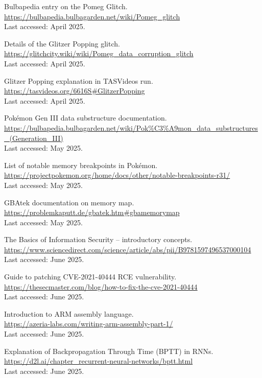 \documentclass[a4paper]{usiinfbachelorproject}
\begin{document}
\begin{thebibliography}{99}
	Bulbapedia entry on the Pomeg Glitch.\\
	\url{https://bulbapedia.bulbagarden.net/wiki/Pomeg_glitch}\\
	Last accessed: April 2025.


	Details of the Glitzer Popping glitch.\\
	\url{https://glitchcity.wiki/wiki/Pomeg_data_corruption_glitch}\\
	Last accessed: April 2025.


	Glitzer Popping explanation in TASVideos run.\\
	\url{https://tasvideos.org/6616S#GlitzerPopping}\\
	Last accessed: April 2025.


	Pokémon Gen III data substructure documentation.\\
	\url{https://bulbapedia.bulbagarden.net/wiki/Pok%C3%A9mon_data_substructures_(Generation_III)}\\
	Last accessed: May 2025.


	List of notable memory breakpoints in Pokémon.\\
	\url{https://projectpokemon.org/home/docs/other/notable-breakpoints-r31/}\\
	Last accessed: May 2025.


	GBAtek documentation on memory map.\\
	\url{https://problemkaputt.de/gbatek.htm#gbamemorymap}\\
	Last accessed: May 2025.


	The Basics of Information Security – introductory concepts.\\
	\url{https://www.sciencedirect.com/science/article/abs/pii/B9781597496537000104}\\
	Last accessed: June 2025.


	Guide to patching CVE-2021-40444 RCE vulnerability.\\
	\url{https://thesecmaster.com/blog/how-to-fix-the-cve-2021-40444}\\
	Last accessed: June 2025.


	Introduction to ARM assembly language.\\
	\url{https://azeria-labs.com/writing-arm-assembly-part-1/}\\
	Last accessed: June 2025.


	Explanation of Backpropagation Through Time (BPTT) in RNNs.\\
	\url{https://d2l.ai/chapter_recurrent-neural-networks/bptt.html}\\
	Last accessed: June 2025.



\end{thebibliography}
\end{document}
